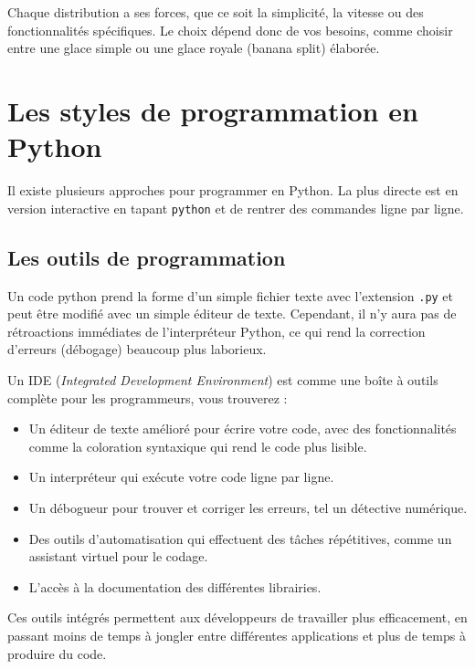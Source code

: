 \documentclass[
  french,
  11pt,
  letterpaper,
  open=any,
  twoside=false,
  french]{scrbook}
\begin{document}
Chaque distribution a ses forces, que ce soit la simplicité, la vitesse
ou des fonctionnalités spécifiques. Le choix dépend donc de vos besoins,
comme choisir entre une glace simple ou une glace royale (banana split)
élaborée.

\section{Les styles de programmation en
Python}\label{les-styles-de-programmation-en-python}

Il existe plusieurs approches pour programmer en Python. La plus directe
est en version interactive en tapant \texttt{python} et de rentrer des
commandes ligne par ligne.

\subsection{Les outils de
programmation}\label{les-outils-de-programmation}

Un code python prend la forme d'un simple fichier texte avec l'extension
\texttt{.py} et peut être modifié avec un simple éditeur de texte.
Cependant, il n'y aura pas de rétroactions immédiates de l'interpréteur
Python, ce qui rend la correction d'erreurs (débogage) beaucoup plus
laborieux.

Un IDE (\emph{Integrated Development Environment}) est comme une boîte à
outils complète pour les programmeurs, vous trouverez :

\begin{itemize}
\item
  Un éditeur de texte amélioré pour écrire votre code, avec des
  fonctionnalités comme la coloration syntaxique qui rend le code plus
  lisible.
\item
  Un interpréteur qui exécute votre code ligne par ligne.
\item
  Un débogueur pour trouver et corriger les erreurs, tel un détective
  numérique.
\item
  Des outils d'automatisation qui effectuent des tâches répétitives,
  comme un assistant virtuel pour le codage.
\item
  L'accès à la documentation des différentes librairies.
\end{itemize}

Ces outils intégrés permettent aux développeurs de travailler plus
efficacement, en passant moins de temps à jongler entre différentes
applications et plus de temps à produire du code.
\end{document}

